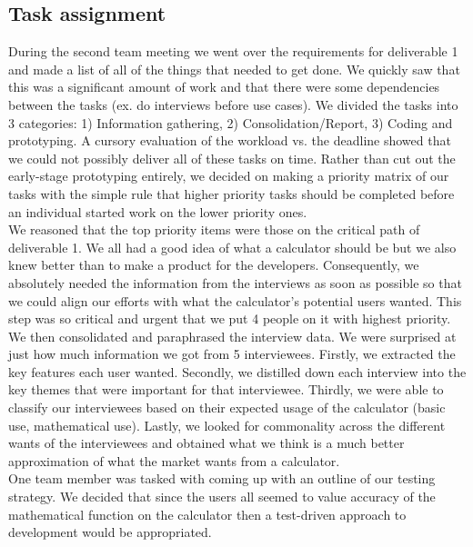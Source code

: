 \documentclass[a4paper]{article}
\begin{document}
\subsection{Task assignment}

During the second team meeting we went over the requirements for deliverable 1 and made a list of all of the things that needed to get done. We quickly saw that this was a significant amount of work and that there were some dependencies between the tasks (ex. do interviews before use cases). We divided the tasks into 3 categories: 1) Information gathering, 2) Consolidation/Report, 3) Coding and prototyping. A cursory evaluation of the workload vs. the deadline showed that we could not possibly deliver all of these tasks on time. Rather than cut out the early-stage prototyping entirely, we decided on making a priority matrix of our tasks with the simple rule that higher priority tasks should be completed before an individual started work on the lower priority ones. \\

We reasoned that the top priority items were those on the critical path of deliverable 1. We all had a good idea of what a calculator should be but we also knew better than to make a product for the developers. Consequently, we absolutely needed the information from the interviews as soon as possible so that we could align our efforts with what the calculator's potential users wanted. This step was so critical and urgent that we put 4 people on it with highest priority. \\

We then consolidated and paraphrased the interview data. We were surprised at just how much information we got from 5 interviewees. Firstly, we extracted the key features each user wanted. Secondly, we distilled down each interview into the key themes that were important for that interviewee. Thirdly, we were able to classify our interviewees based on their expected usage of the calculator (basic use, mathematical use). Lastly, we looked for commonality across the different wants of the interviewees and obtained what we think is a much better approximation of what the market wants from a calculator. \\

One team member was tasked with coming up with an outline of our testing strategy. We decided that since the users all seemed to value accuracy of the mathematical function on the calculator then a test-driven approach to development would be appropriated. \\
\end{document}
